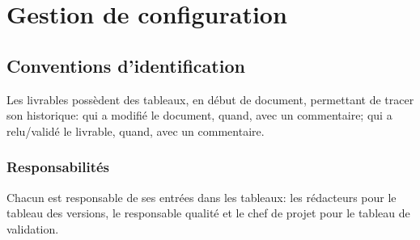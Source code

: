 \documentclass[twoside]{article}
\begin{document}
%
%
%
%
%
%
%




\section{Gestion de configuration}

\subsection{Conventions d'identification}
Les livrables possèdent des tableaux, en début de document, permettant
de tracer son historique: qui a modifié le document, quand, avec un
commentaire; qui a relu/validé le livrable, quand, avec un commentaire.

\subsubsection{Responsabilités}
Chacun est responsable de ses entrées dans les tableaux: les rédacteurs
pour le tableau des versions, le responsable qualité et le chef de projet
pour le tableau de validation.
\end{document}
